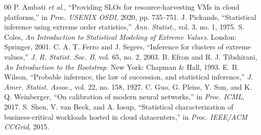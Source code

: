 \documentclass[conference]{IEEEtran}
\begin{document}
\begin{thebibliography}{00}
 P. Ambati \emph{et al.}, ``Providing SLOs for resource-harvesting VMs in cloud platforms,'' in \emph{Proc. USENIX OSDI}, 2020, pp. 735--751.
 J. Pickands, ``Statistical inference using extreme order statistics,'' \emph{Ann. Statist.}, vol. 3, no. 1, 1975.
 S. Coles, \emph{An Introduction to Statistical Modeling of Extreme Values}. London: Springer, 2001.
 C. A. T. Ferro and J. Segers, ``Inference for clusters of extreme values,'' \emph{J. R. Statist. Soc. B}, vol. 65, no. 2, 2003.
 B. Efron and R. J. Tibshirani, \emph{An Introduction to the Bootstrap}. New York: Chapman \& Hall, 1993.
 E. B. Wilson, ``Probable inference, the law of succession, and statistical inference,'' \emph{J. Amer. Statist. Assoc.}, vol. 22, no. 158, 1927.
 C. Guo, G. Pleiss, Y. Sun, and K. Q. Weinberger, ``On calibration of modern neural networks,'' in \emph{Proc. ICML}, 2017.
 S. Shen, V. van Beek, and A. Iosup, ``Statistical characterization of business-critical workloads hosted in cloud datacenters,'' in \emph{Proc. IEEE/ACM CCGrid}, 2015.
\end{thebibliography}
\end{document}
